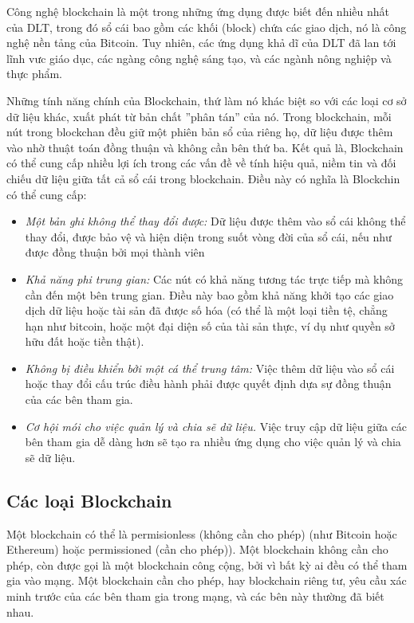 \documentclass[12pt,a4paper]{article}
\begin{document}
Công nghệ blockchain là một trong những ứng dụng được biết đến nhiều nhất của DLT, trong đó sổ cái bao gồm các khối (block) chứa các giao dịch, nó là công nghệ nền tảng của Bitcoin. Tuy nhiên, các ứng dụng khả dĩ của DLT đã lan tới lĩnh vưc giáo dục, các ngàng công nghệ sáng tạo, và các ngành nông nghiệp và thực phẩm.

Những tính năng chính của Blockchain,  thứ làm nó khác biệt so với các loại cơ sở dữ liệu khác, xuất phát từ bản chất ''phân tán'' của nó. Trong blockchain, mỗi nút trong blockchan đều giữ một phiên bản sổ của riêng họ, dữ liệu được thêm vào nhờ thuật toán đồng thuận và không cần bên thứ ba. Kết quả là, Blockchain có thể cung cấp nhiều lợi ích trong các vấn đề về tính hiệu quả, niềm tin và đối chiếu dữ liệu giữa tất cả sổ cái trong blockchain. Điều này có nghĩa là Blockchin có thể cung cấp:
\begin{itemize}
	\item \textit{Một bản ghi không thể thay đổi được:} Dữ liệu được thêm vào sổ cái không thể thay đổi, được bảo vệ và hiện diện trong suốt vòng đời của sổ cái, nếu như được đồng thuận bởi mọi thành viên
	 \item \textit{Khả năng phi trung gian:} Các nút có khả năng tương tác trực tiếp mà không cần đến một bên trung gian. Điều này bao gồm khả năng khởi tạo các giao dịch dữ liệu hoặc tài sản đã được số hóa (có thể là một loại tiền tệ, chẳng hạn như bitcoin, hoặc một đại diện số của tài sản thực, ví dụ như quyền sở hữu đất hoặc tiền thật).
	\item \textit{Không bị điều khiển bởi một cá thể trung tâm:} Việc thêm dữ liệu vào sổ cái hoặc thay đổi cấu trúc điều hành phải được quyết định dựa sự đồng thuận của các bên tham gia.
	\item \textit{Cơ hội mói cho việc quản lý và chia sẽ dữ liệu.} Việc truy cập dữ liệu giữa các bên tham gia dễ dàng hơn sẽ tạo ra nhiều ứng dụng cho việc quản lý và chia sẽ dữ liệu. 
\end{itemize}

\subsection{Các loại Blockchain}
Một blockchain có thể là permisionless (không cần cho phép) (như Bitcoin hoặc Ethereum) hoặc permissioned (cần cho phép)). Một blockchain không cần cho phép, còn được gọi là một blockchain công cộng, bởi vì bất kỳ ai đều có thể tham gia vào mạng. Một blockchain cần cho phép, hay blockchain riêng tư, yêu cầu xác minh trước của các bên tham gia trong mạng, và các bên này thường đã biết nhau.
\end{document}

